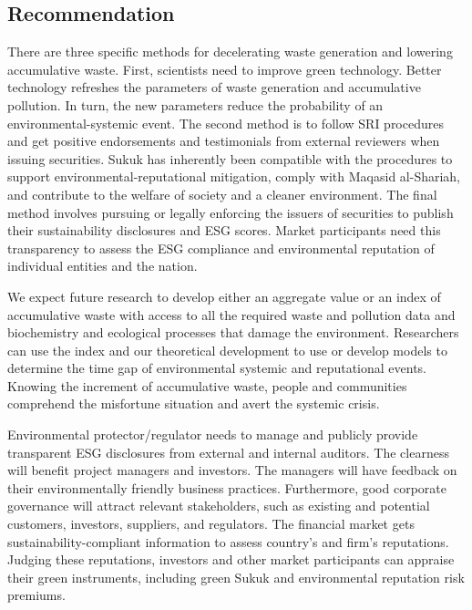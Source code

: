 \documentclass[sn-basic]{sn-jnl}%
\theoremstyle{thmstyleone}%
\theoremstyle{thmstyletwo}%
\theoremstyle{thmstylethree}%
\begin{document}
\subsection{Recommendation}
There are three specific methods for decelerating waste generation and lowering accumulative waste. First, scientists need to improve green technology. Better technology refreshes the parameters of waste generation and accumulative pollution. In turn, the new parameters reduce the probability of an environmental-systemic event. The second method is to follow SRI procedures and get positive endorsements and testimonials from external reviewers when issuing securities. Sukuk has inherently been compatible with the procedures to support environmental-reputational mitigation, comply with Maqasid al-Shariah, and contribute to the welfare of society and a cleaner environment. The final method involves pursuing or legally enforcing the issuers of securities to publish their sustainability disclosures and ESG scores. Market participants need this transparency to assess the ESG compliance and environmental reputation of individual entities and the nation.

We expect future research to develop either an aggregate value or an index of accumulative waste with access to all the required waste and pollution data and biochemistry and ecological processes that damage the environment. Researchers can use the index and our theoretical development to use or develop models to determine the time gap of environmental systemic and reputational events. Knowing the increment of accumulative waste, people and communities comprehend the misfortune situation and avert the systemic crisis.

Environmental protector/regulator needs to manage and publicly provide transparent ESG disclosures from external and internal auditors. The clearness will benefit project managers and investors. The managers will have feedback on their environmentally friendly business practices. Furthermore, good corporate governance will attract relevant stakeholders, such as existing and potential customers, investors, suppliers, and regulators. The financial market gets sustainability-compliant information to assess country’s and firm’s reputations. Judging these reputations, investors and other market participants can appraise their green instruments, including green Sukuk and environmental reputation risk premiums.

\backmatter

\end{document}
